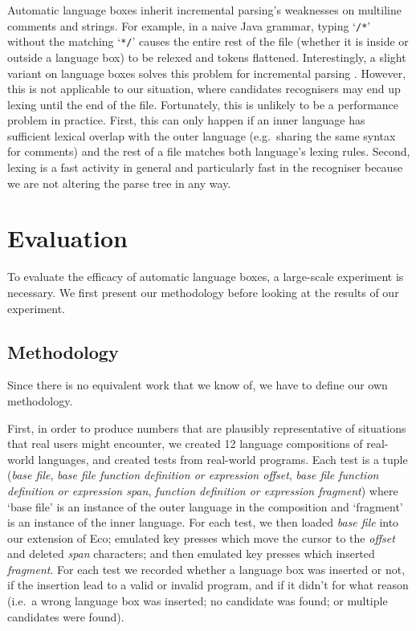\documentclass[sigplan,screen]{acmart}\settopmatter{printfolios=true,printccs=false,printacmref=false}
\begin{document}
Automatic language boxes inherit incremental parsing's weaknesses on multiline
comments and strings. For example, in a naive Java grammar, typing
`\texttt{/*}' without the matching `\texttt{*/}' causes the entire rest of the
file (whether it is inside or outside a language box) to be relexed and tokens
flattened. Interestingly, a slight variant on language boxes solves this problem
for incremental parsing \cite[p.~108--122]{diekmann18editing}.
However, this is not applicable to our situation, where candidates
recognisers may end up lexing until the end of the file. Fortunately, this is
unlikely to be a performance problem in practice. First, this can only happen
if an inner language has sufficient lexical overlap with the outer language
(e.g.~sharing the same syntax for comments) and the rest of a file matches both
language's lexing rules.  Second, lexing is a fast activity in general and
particularly fast in the recogniser because we are not altering the parse tree
in any way.


\section{Evaluation}
\label{sec:evaluation}

To evaluate the efficacy of automatic language boxes, a large-scale experiment
is necessary. We first present our methodology before looking at the results of
our experiment.


\subsection{Methodology}

Since there is no equivalent work that we know of, we have to
define our own methodology.

First, in order to produce numbers that are plausibly representative of situations
that real users might encounter, we created 12 language compositions of
real-world languages, and created \totalinsertions tests from real-world
programs. Each test is a tuple (\emph{base file}, \emph{base file function
definition or expression offset}, \emph{base file function definition or
expression span}, \emph{function definition or expression fragment}) where
`base file' is an instance of the outer language in the composition and
`fragment' is an instance of the inner language. For each test, we then loaded
\emph{base file} into our extension of Eco; emulated key presses which move the
cursor to the \emph{offset} and deleted \emph{span} characters; and then
emulated key presses which inserted \emph{fragment}. For each test we recorded
 whether a language box was inserted or not, if
the insertion lead to a valid or invalid program, and if it didn't for what
reason (i.e.~a wrong language box was inserted; no candidate was found; or
multiple candidates were found).
\end{document}

